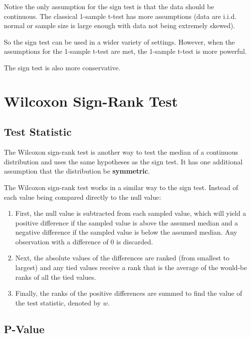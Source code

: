 \documentclass[
]{book}
\theoremstyle{definition}
\theoremstyle{definition}
\theoremstyle{definition}
\theoremstyle{definition}
\theoremstyle{remark}
\begin{document}
Notice the only assumption for the sign test is that the data should be continuous. The classical 1-sample t-test has more assumptions (data are i.i.d. normal or sample size is large enough with data not being extremely skewed).

So the sign test can be used in a wider variety of settings. However, when the assumptions for the 1-sample t-test are met, the 1-sample t-test is more powerful.

The sign test is also more conservative.

\hypertarget{wilcoxon-sign-rank-test}{%
\section{Wilcoxon Sign-Rank Test}\label{wilcoxon-sign-rank-test}}

\hypertarget{test-statistic-2}{%
\subsection{Test Statistic}\label{test-statistic-2}}

The Wilcoxon sign-rank test is another way to test the median of a continuous distribution and uses the same hypotheses as the sign test. It has one additional assumption that the distribution be \textbf{symmetric}.

The Wilcoxon sign-rank test works in a similar way to the sign test. Instead of each value being compared directly to the null value:

\begin{enumerate}
\def\labelenumi{\arabic{enumi}.}
\item
  First, the null value is subtracted from each sampled value, which will yield a positive difference if the sampled value is above the assumed median and a negative difference if the sampled value is below the assumed median. Any observation with a difference of 0 is discarded.
\item
  Next, the absolute values of the differences are ranked (from smallest to largest) and any tied values receive a rank that is the average of the would-be ranks of all the tied values.
\item
  Finally, the ranks of the positive differences are summed to find the value of the test statistic, denoted by \(w\).
\end{enumerate}

\hypertarget{p-value-1}{%
\subsection{P-Value}\label{p-value-1}}
\end{document}
